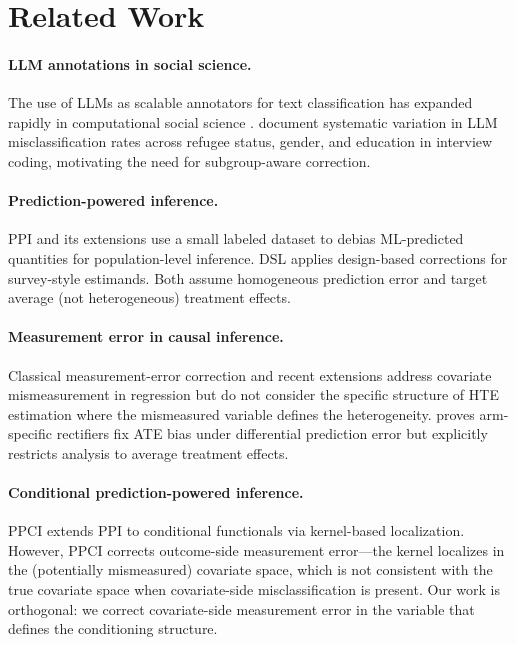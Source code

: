 \documentclass[11pt,a4paper]{article}
\begin{document}
\section{Related Work}

\paragraph{LLM annotations in social science.}
The use of LLMs as scalable annotators for text classification has expanded rapidly in computational social science \citep{gilardi2023chatgpt,ziems2024llm}.
\citet{ashwin2025} document systematic variation in LLM misclassification rates across refugee status, gender, and education in interview coding, motivating the need for subgroup-aware correction.

\paragraph{Prediction-powered inference.}
PPI \citep{angelopoulos2023ppi} and its extensions \citep{angelopoulos2023ppiplus} use a small labeled dataset to debias ML-predicted quantities for population-level inference.
DSL \citep{egami2024dsl} applies design-based corrections for survey-style estimands.
Both assume homogeneous prediction error and target average (not heterogeneous) treatment effects.

\paragraph{Measurement error in causal inference.}
Classical measurement-error correction \citep{carroll2006measurement} and recent extensions \citep{bu2023forestiv} address covariate mismeasurement in regression but do not consider the specific structure of HTE estimation where the mismeasured variable defines the heterogeneity.
\citet{mozer2026} proves arm-specific rectifiers fix ATE bias under differential prediction error but explicitly restricts analysis to average treatment effects.

\paragraph{Conditional prediction-powered inference.}
PPCI \citep{sui2026} extends PPI to conditional functionals via kernel-based localization.
However, PPCI corrects outcome-side measurement error---the kernel localizes in the (potentially mismeasured) covariate space, which is not consistent with the true covariate space when covariate-side misclassification is present.
Our work is orthogonal: we correct covariate-side measurement error in the variable that defines the conditioning structure.
\end{document}
